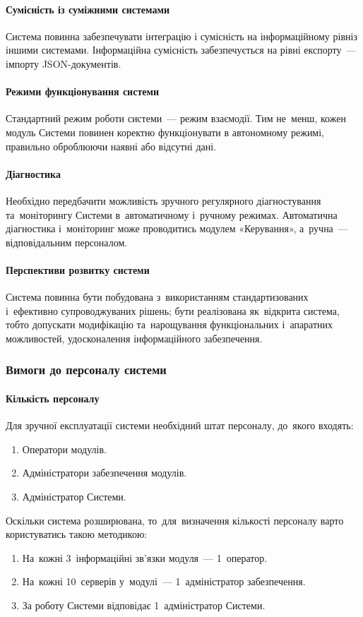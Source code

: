 \documentclass[
	a4paper,
	oneside,
	BCOR = 10mm,
	DIV = 12,
	12pt,
	headings = normal,
]{scrartcl}
\newcommand{\allcaps}[1]{{\addfontfeatures{LetterSpace = 5, Kerning = Off}#1}}
\begin{document}
				\paragraph{Сумісність із суміжними системами}
					Система повинна забезпечувати інтеграцію і сумісність на інформаційному рівніз іншими системами. Інформаційна сумісність забезпечується на рівні експорту~— імпорту \allcaps{JSON}-документів.
					
				\paragraph{Режими функціонування системи}
					Стандартний режим роботи системи~— режим взаємодії. Тим не~менш, кожен модуль Системи повинен коректно функціонувати в автономному режимі, правильно оброблюючи наявні або відсутні дані. 
					
				\paragraph{Діагностика}
					Необхідно передбачити можливість зручного регулярного діагностування та~моніторингу Системи в~автоматичному і~ручному режимах. Автоматична діагностика і~моніторинг може проводитись модулем «Керування», а~ручна~— відповідальним персоналом.
					
				\paragraph{Перспективи розвитку системи}
					Система повинна бути побудована з~використанням стандартизованих і~ефективно супроводжуваних рішень; бути реалізована як~відкрита система, тобто допускати модифікацію та~нарощування функціональних і~апаратних можливостей, удосконалення інформаційного забезпечення.
				
			\subsubsection{Вимоги до персоналу системи}
				\paragraph{Кількість персоналу}
					Для зручної експлуатації системи необхідний штат персоналу, до~якого входять:
					\begin{enumerate}[noitemsep]
						\item Оператори модулів.
						\item Адміністратори забезпечення модулів.
						\item Адміністратор Системи.
					\end{enumerate}
					Оскільки система розширювана, то~для~визначення кількості персоналу варто користуватись такою методикою:
					\begin{enumerate}[noitemsep]
						\item На~кожні 3~інформаційні зв'язки модуля~— 1~оператор.
						\item На~кожні 10~серверів у~модулі~— 1~адміністратор забезпечення.
						\item За роботу Системи відповідає 1~адміністратор Системи.
					\end{enumerate}
					
\end{document}
